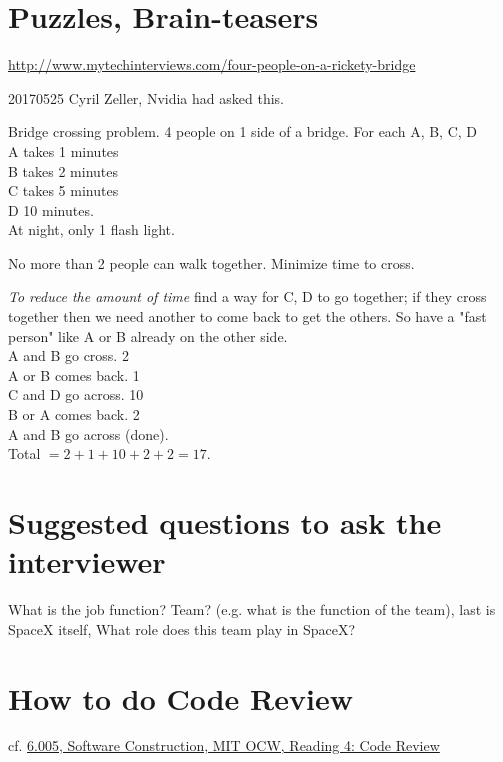 \documentclass[10pt]{amsart}
\begin{document}
\section{Puzzles, Brain-teasers}

\url{http://www.mytechinterviews.com/four-people-on-a-rickety-bridge}

20170525 Cyril Zeller, Nvidia had asked this.

Bridge crossing problem. 4 people on 1 side of a bridge. For each A, B, C, D \\
A takes 1 minutes \\
B takes 2 minutes \\
C takes 5 minutes \\
D 10 minutes. \\

At night, only 1 flash light.

No more than 2 people can walk together. Minimize time to cross.

\emph{To reduce the amount of time} find a way for C, D to go together; if they cross together then we need another to come back to get the others. So have a "fast person" like A or B already on the other side. \\

A and B go cross. 2 \\
A or B comes back. 1 \\
C and D go across. 10 \\
B or A comes back. 2 \\
A and B go across (done). \\

Total $ = 2 + 1 + 10 + 2 + 2 = 17$.


\section{Suggested questions to ask the interviewer}

What is the job function? Team? (e.g. what is the function of the team), last is SpaceX itself, What role does this team play in SpaceX?

\section{How to do Code Review}

cf. \href{https://ocw.mit.edu/ans7870/6/6.005/s16/classes/04-code-review/index.html}{6.005, Software Construction, MIT OCW, Reading 4: Code Review}
\end{document}
